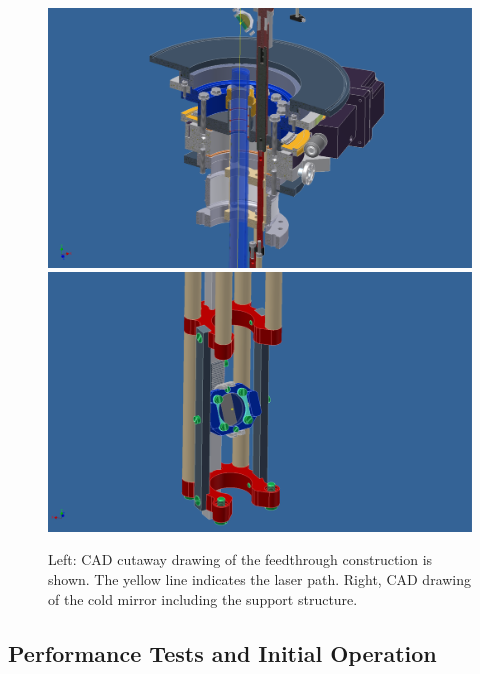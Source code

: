 \begin{figure}
\centering
     \includegraphics[height=0.6\textwidth]{figures/Feedthrough.pdf} \includegraphics[height=0.6\textwidth]{figures/Mirror.pdf}
     \caption[CAD drawing of the feedthrough and the mirror support structure.]{Left: CAD cutaway drawing of the feedthrough construction is shown. The yellow line indicates the laser path. Right, CAD drawing of the cold mirror including the support structure.}
  \label{fig:feedthrough}
\end{figure}


\subsection{Performance Tests and Initial Operation}

